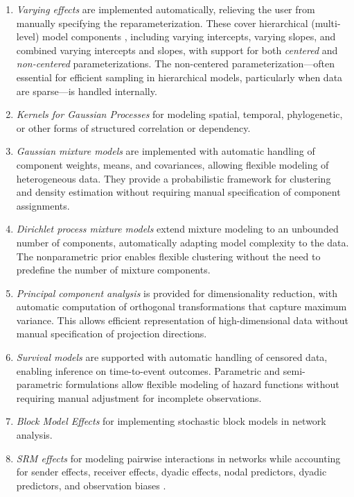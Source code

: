 \documentclass[num-refs]{wiley-article}
\begin{document}
\begin{enumerate}
  \item \textit{Varying effects} are implemented automatically, relieving the user from manually specifying the reparameterization. These cover hierarchical (multi-level) model components \citep{rethinking}, including varying intercepts, varying slopes, and combined varying intercepts and slopes, with support for both \textit{centered} and \textit{non-centered} parameterizations. The non-centered parameterization—often essential for efficient sampling in hierarchical models, particularly when data are sparse—is handled internally.
  
  \item \textit{Kernels for Gaussian Processes} for modeling spatial, temporal, phylogenetic, or other forms of structured correlation or dependency.

  \item \textit{Gaussian mixture models} are implemented with automatic handling of component weights, means, and covariances, allowing flexible modeling of heterogeneous data. They provide a probabilistic framework for clustering and density estimation without requiring manual specification of component assignments.

  \item \textit{Dirichlet process mixture models} extend mixture modeling to an unbounded number of components, automatically adapting model complexity to the data. The nonparametric prior enables flexible clustering without the need to predefine the number of mixture components.

  \item \textit{Principal component analysis} is provided for dimensionality reduction, with automatic computation of orthogonal transformations that capture maximum variance. This allows efficient representation of high-dimensional data without manual specification of projection directions.

  \item \textit{Survival models} are supported with automatic handling of censored data, enabling inference on time-to-event outcomes. Parametric and semi-parametric formulations allow flexible modeling of hazard functions without requiring manual adjustment for incomplete observations.
  
  \item \textit{Block Model Effects} for implementing stochastic block models in network analysis.
  
  \item \textit{SRM effects} for modeling pairwise interactions in networks while accounting for sender effects, receiver effects, dyadic effects, nodal predictors, dyadic predictors, and observation biases \citep{STRAND2025}.
  

\end{enumerate}
\end{document}
